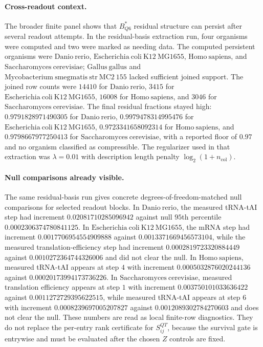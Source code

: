 \paragraph{Cross-readout context.}
The broader finite panel shows that $B^{*}_{Q6}$ residual structure can persist after several readout attempts.  In the residual-basis extraction run, four organisms were computed and two were marked as needing data.  The computed persistent organisms were $\mathrm{Danio\ rerio}$, $\mathrm{Escherichia\ coli\ K12\ MG1655}$, $\mathrm{Homo\ sapiens}$, and $\mathrm{Saccharomyces\ cerevisiae}$; $\mathrm{Gallus\ gallus}$ and $\mathrm{Mycobacterium\ smegmatis\ str\ MC2\ 155}$ lacked sufficient joined support.  The joined row counts were $14410$ for $\mathrm{Danio\ rerio}$, $3415$ for $\mathrm{Escherichia\ coli\ K12\ MG1655}$, $16008$ for $\mathrm{Homo\ sapiens}$, and $3046$ for $\mathrm{Saccharomyces\ cerevisiae}$.  The final residual fractions stayed high: $0.9791828971490305$ for $\mathrm{Danio\ rerio}$, $0.9979478314995476$ for $\mathrm{Escherichia\ coli\ K12\ MG1655}$, $0.9723341658092314$ for $\mathrm{Homo\ sapiens}$, and $0.9798667977250413$ for $\mathrm{Saccharomyces\ cerevisiae}$, with a reported floor of $0.97$ and no organism classified as compressible.  The regularizer used in that extraction was $\lambda=0.01$ with description length penalty $\log_2(1+n_{\mathrm{col}})$.

\paragraph{Null comparisons already visible.}
The same residual-basis run gives concrete degrees-of-freedom-matched null comparisons for selected readout blocks.  In $\mathrm{Danio\ rerio}$, the measured tRNA-tAI step had increment $0.02081710285096942$ against null $95$th percentile $0.0002306374780841125$.  In $\mathrm{Escherichia\ coli\ K12\ MG1655}$, the mRNA step had increment $0.0017706954554909888$ against $0.0013371669456573104$, while the measured translation-efficiency step had increment $0.0002819723320884449$ against $0.0010272364744326006$ and did not clear the null.  In $\mathrm{Homo\ sapiens}$, measured tRNA-tAI appears at step $4$ with increment $0.0005032876020244136$ against $0.00020173994173736226$.  In $\mathrm{Saccharomyces\ cerevisiae}$, measured translation efficiency appears at step $1$ with increment $0.003750101033636422$ against $0.0011272729395622515$, while measured tRNA-tAI appears at step $6$ with increment $0.0008239697005207827$ against $0.0012089302784270603$ and does not clear the null.  These numbers are read as local finite-row diagnostics.  They do not replace the per-entry rank certificate for $S^{QT}_{ij}$, because the survival gate is entrywise and must be evaluated after the chosen $Z$ controls are fixed.

